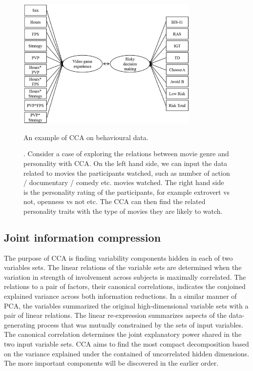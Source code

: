 \begin{figure}[H]
    \vspace{-10pt}
    \centering
    \includegraphics[width=0.8\textwidth]{cca/image/ccafig1.jpg}
	\caption{An example of CCA on behavioural data.}
	\linespacesmall
	\footnotesize
	\caption*{\cite{Bailey2013}. Consider a case of exploring the relations between movie genre and personality with CCA. On the left hand side, we can input the data related to movies the participants watched, such as number of action / documentary / comedy etc. movies watched. The right hand side is the personality rating of the participants, for example extrovert vs not, openness vs not etc. The CCA can then find the related personality traits with the type of movies they are likely to watch.}
    \linespacenormal
	\label{fig:methods:fig1}
	\vspace{-20pt}
\end{figure}


\subsection{Joint information compression}
The purpose of CCA is finding variability components hidden in each of two variables sets.  The linear relations of the variable sets are determined when the variation in strength of involvement across subjects is maximally correlated. The relations to a pair of factors, their canonical correlations, indicates the conjoined explained variance across both information reductions. In a similar manner of PCA, the variables summarized the original high-dimensional variable sets with a pair of linear relations. The linear re-expression summarizes aspects of the data-generating process that was mutually constrained by the sets of input variables. The canonical correlation determines the joint explanatory power shared in the two input variable sets. CCA aims to find the most compact decomposition based on the variance explained under the contained of uncorrelated hidden dimensions. The more important components will be discovered in the earlier order.

